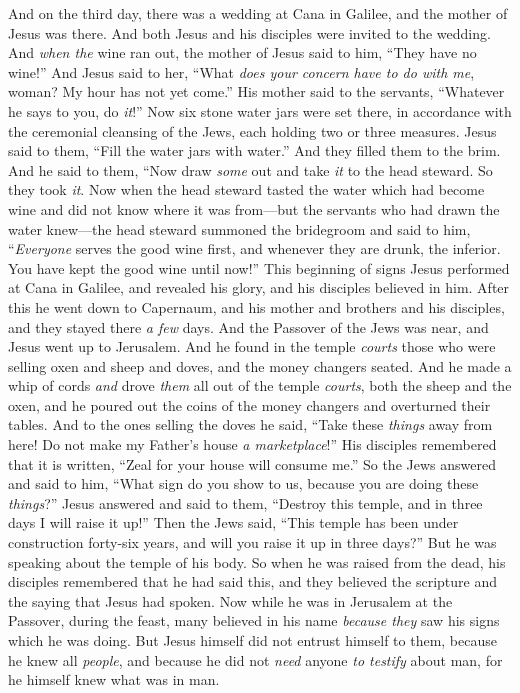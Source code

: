 \begin{biblechapter} %
 And on the third day, there was a wedding at Cana in Galilee, and the mother of Jesus was there.
\verse And both Jesus and his disciples were invited to the wedding.
\verse And \textit{when the} wine ran out, the mother of Jesus said to him, “They have no wine!”
\verse And Jesus said to her, “What \textit{does your concern have to do with me}, woman? My hour has not yet come.”
\verse His mother said to the servants, “Whatever he says to you, do \textit{it}!”
\verse Now six stone water jars were set there, in accordance with the ceremonial cleansing of the Jews, each holding two or three measures.
\verse Jesus said to them, “Fill the water jars with water.” And they filled them to the brim.
\verse And he said to them, “Now draw \textit{some} out and take \textit{it} to the head steward. So they took \textit{it}.
\verse Now when the head steward tasted the water which had become wine and did not know where it was from—but the servants who had drawn the water knew—the head steward summoned the bridegroom
\verse and said to him, “\textit{Everyone} serves the good wine first, and whenever they are drunk, the inferior. You have kept the good wine until now!”
\verse This beginning of signs Jesus performed at Cana in Galilee, and revealed his glory, and his disciples believed in him.
 After this he went down to Capernaum, and his mother and brothers and his disciples, and they stayed there \textit{a few} days.
\verse And the Passover of the Jews was near, and Jesus went up to Jerusalem.
 And he found in the temple \textit{courts} those who were selling oxen and sheep and doves, and the money changers seated.
\verse And he made a whip of cords \textit{and} drove \textit{them} all out of the temple \textit{courts}, both the sheep and the oxen, and he poured out the coins of the money changers and overturned their tables.
\verse And to the ones selling the doves he said, “Take these \textit{things} away from here! Do not make my Father’s house \textit{a marketplace}!”
\verse His disciples remembered that it is written, “Zeal for your house will consume me.”
\verse So the Jews answered and said to him, “What sign do you show to us, because you are doing these \textit{things}?”
\verse Jesus answered and said to them, “Destroy this temple, and in three days I will raise it up!”
\verse Then the Jews said, “This temple has been under construction forty-six years, and will you raise it up in three days?”
\verse But he was speaking about the temple of his body.
\verse So when he was raised from the dead, his disciples remembered that he had said this, and they believed the scripture and the saying that Jesus had spoken.
 Now while he was in Jerusalem at the Passover, during the feast, many believed in his name \textit{because they} saw his signs which he was doing.
\verse But Jesus himself did not entrust himself to them, because he knew all \textit{people},
\verse and because he did not \textit{need} anyone \textit{to testify} about man, for he himself knew what was in man.
\end{biblechapter}

